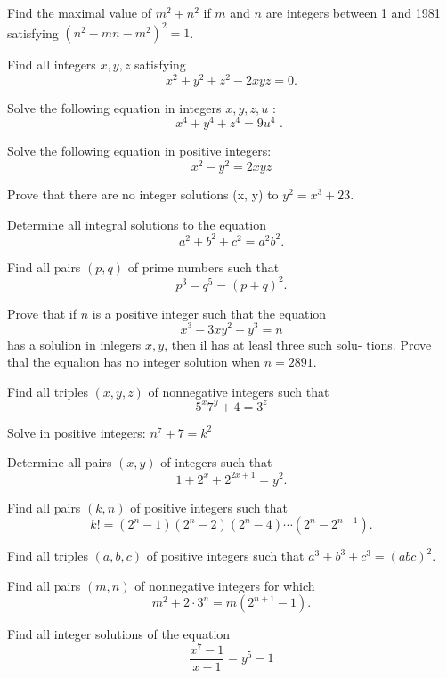 \documentclass[11pt]{scrartcl}
\begin{document}
\begin{problem}
Find the maximal value of \(m^{2}+n^{2}\) if \(m\) and \(n\) are integers between 1 and 1981 satisfying \(\left(n^{2}-m n-m^{2}\right)^{2}=1\).
\end{problem}
\begin{problem}
Find all integers \(x, y, z\) satisfying
\[
x^{2}+y^{2}+z^{2}-2 x y z=0 .
\]
\end{problem}
\begin{problem}
Solve the following equation in integers \(x, y, z, u\) :
\[
x^{4}+y^{4}+z^{4}=9 u^{4} \text { . }
\]
\end{problem}
\begin{problem}
Solve the following equation in positive integers:
\[
x^{2}-y^{2}=2 x y z
\]
\end{problem}
\begin{problem}
Prove that there are no integer solutions (x, y) to \(y^2=x^3+23\).
\end{problem}
\begin{problem}
Determine all integral solutions to the equation
\[
a^{2}+b^{2}+c^{2}=a^{2} b^{2} .
\]
\end{problem}
\begin{problem}
Find all pairs \((p, q)\) of prime numbers such that
\[
p^{3}-q^{5}=(p+q)^{2} .
\]
\end{problem}
\begin{problem}
Prove that if \(n\) is a positive integer such that the
equation
\[
x^{3}-3 x y^{2}+y^{3}=n
\]
has a solulion in inlegers \(x, y\), then il has at leasl three such solu-
tions. Prove thal the equalion has no integer solution when \(n=2891 .\)
\end{problem}
\begin{problem}
Find all triples \((x, y, z)\) of nonnegative integers such that
\[
5^{x} 7^{y}+4=3^{z}
\]
\end{problem}
\begin{problem}
Solve in positive integers: \(n^7+7=k^2\)
\end{problem}
\begin{problem}
Determine all pairs $(x, y)$ of integers such that
\[1+2^{x}+2^{2x+1}= y^{2}.\]
\end{problem}
\begin{problem}
Find all pairs $(k,n)$ of positive integers such that \[ k!=(2^n-1)(2^n-2)(2^n-4)\cdots(2^n-2^{n-1}). \]
\end{problem}
\begin{problem}
Find all triples $(a, b, c)$ of positive integers such that $a^3 + b^3 + c^3 = (abc)^2$.
\end{problem}
\begin{problem}
Find all pairs $(m,n)$ of nonnegative integers for which \[m^2 + 2 \cdot 3^n = m\left(2^{n+1} - 1\right).\]
\end{problem}
\begin{problem}
Find all integer solutions of the equation \[\frac{x^{7}-1}{x-1}=y^{5}-1\]
\end{problem}
\end{document}

